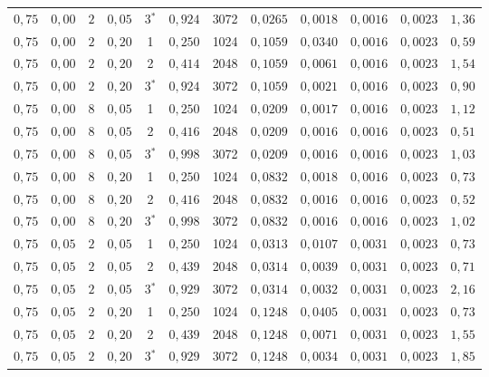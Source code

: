 \begin{tabular}{cccccccccccc}
$0{,}75$ & $0{,}00$ & $2$ & $0{,}05$ & 3$^*$ & $0{,}924$ & 3072 & $0{,}0265$ & $0{,}0018$ & $0{,}0016$ & $0{,}0023$ & $1{,}36$ \\
$0{,}75$ & $0{,}00$ & $2$ & $0{,}20$ & 1 & $0{,}250$ & 1024 & $0{,}1059$ & $0{,}0340$ & $0{,}0016$ & $0{,}0023$ & $0{,}59$ \\
$0{,}75$ & $0{,}00$ & $2$ & $0{,}20$ & 2 & $0{,}414$ & 2048 & $0{,}1059$ & $0{,}0061$ & $0{,}0016$ & $0{,}0023$ & $1{,}54$ \\
$0{,}75$ & $0{,}00$ & $2$ & $0{,}20$ & 3$^*$ & $0{,}924$ & 3072 & $0{,}1059$ & $0{,}0021$ & $0{,}0016$ & $0{,}0023$ & $0{,}90$ \\
$0{,}75$ & $0{,}00$ & $8$ & $0{,}05$ & 1 & $0{,}250$ & 1024 & $0{,}0209$ & $0{,}0017$ & $0{,}0016$ & $0{,}0023$ & $1{,}12$ \\
$0{,}75$ & $0{,}00$ & $8$ & $0{,}05$ & 2 & $0{,}416$ & 2048 & $0{,}0209$ & $0{,}0016$ & $0{,}0016$ & $0{,}0023$ & $0{,}51$ \\
$0{,}75$ & $0{,}00$ & $8$ & $0{,}05$ & 3$^*$ & $0{,}998$ & 3072 & $0{,}0209$ & $0{,}0016$ & $0{,}0016$ & $0{,}0023$ & $1{,}03$ \\
$0{,}75$ & $0{,}00$ & $8$ & $0{,}20$ & 1 & $0{,}250$ & 1024 & $0{,}0832$ & $0{,}0018$ & $0{,}0016$ & $0{,}0023$ & $0{,}73$ \\
$0{,}75$ & $0{,}00$ & $8$ & $0{,}20$ & 2 & $0{,}416$ & 2048 & $0{,}0832$ & $0{,}0016$ & $0{,}0016$ & $0{,}0023$ & $0{,}52$ \\
$0{,}75$ & $0{,}00$ & $8$ & $0{,}20$ & 3$^*$ & $0{,}998$ & 3072 & $0{,}0832$ & $0{,}0016$ & $0{,}0016$ & $0{,}0023$ & $1{,}02$ \\
\midrule
$0{,}75$ & $0{,}05$ & $2$ & $0{,}05$ & 1 & $0{,}250$ & 1024 & $0{,}0313$ & $0{,}0107$ & $0{,}0031$ & $0{,}0023$ & $0{,}73$ \\
$0{,}75$ & $0{,}05$ & $2$ & $0{,}05$ & 2 & $0{,}439$ & 2048 & $0{,}0314$ & $0{,}0039$ & $0{,}0031$ & $0{,}0023$ & $0{,}71$ \\
$0{,}75$ & $0{,}05$ & $2$ & $0{,}05$ & 3$^*$ & $0{,}929$ & 3072 & $0{,}0314$ & $0{,}0032$ & $0{,}0031$ & $0{,}0023$ & $2{,}16$ \\
$0{,}75$ & $0{,}05$ & $2$ & $0{,}20$ & 1 & $0{,}250$ & 1024 & $0{,}1248$ & $0{,}0405$ & $0{,}0031$ & $0{,}0023$ & $0{,}73$ \\
$0{,}75$ & $0{,}05$ & $2$ & $0{,}20$ & 2 & $0{,}439$ & 2048 & $0{,}1248$ & $0{,}0071$ & $0{,}0031$ & $0{,}0023$ & $1{,}55$ \\
$0{,}75$ & $0{,}05$ & $2$ & $0{,}20$ & 3$^*$ & $0{,}929$ & 3072 & $0{,}1248$ & $0{,}0034$ & $0{,}0031$ & $0{,}0023$ & $1{,}85$ \\

\end{tabular}
